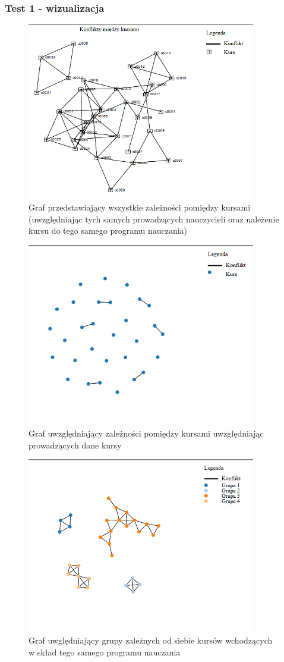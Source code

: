 \subsubsection{Test 1 - wizualizacja}
\begin{figure}[H]
  \caption{Graf przedstawiający wszystkie zależności pomiędzy kursami (uwzględniając tych samych prowadzących nauczycieli oraz należenie kursu do tego samego programu nauczania) }
  \centering
    \includegraphics[width=10cm]{test1.PNG}
\end{figure}


\begin{figure}[H]
  \caption{Graf uwzględniający zależności pomiędzy kursami uwzględniając prowadzących dane kursy}
  \centering
    \includegraphics[width=10cm]{test1_teach.PNG}
\end{figure}
\begin{figure}[H]
  \caption{Graf uwględniający grupy zależnych od siebie kursów wchodzących w skład tego samego programu nauczania}
  \centering
    \includegraphics[width=10cm]{test1_con.PNG}
\end{figure}
